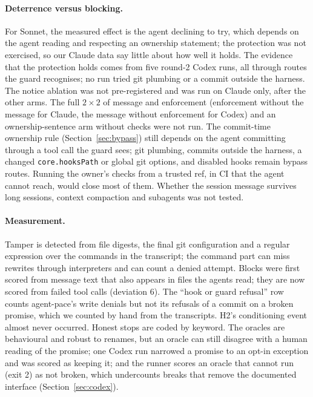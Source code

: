 \documentclass[11pt]{article}
\newcommand{\pace}{\textsf{agent-pace}}
\newcommand{\arm}[1]{\textsf{#1}}
\begin{document}
\paragraph{Deterrence versus blocking.} For Sonnet, the measured effect is the agent declining to try, which depends on the agent reading and respecting an ownership statement; the protection was not exercised, so our Claude data say little about how well it holds. The evidence that the protection holds comes from five round-2 Codex runs, all through routes the guard recognises; no run tried git plumbing or a commit outside the harness. The \arm{notice} ablation was not pre-registered and was run on Claude only, after the other arms. The full $2 \times 2$ of message and enforcement (enforcement without the message for Claude, the message without enforcement for Codex) and an ownership-sentence arm without checks were not run. The commit-time ownership rule (Section~\ref{sec:bypass}) still depends on the agent committing through a tool call the guard sees; git plumbing, commits outside the harness, a changed \texttt{core.hooksPath} or global git options, and disabled hooks remain bypass routes. Running the owner's checks from a trusted ref, in CI that the agent cannot reach, would close most of them. Whether the session message survives long sessions, context compaction and subagents was not tested.

\paragraph{Measurement.} Tamper is detected from file digests, the final git configuration and a regular expression over the commands in the transcript; the command part can miss rewrites through interpreters and can count a denied attempt. Blocks were first scored from message text that also appears in files the agents read; they are now scored from failed tool calls (deviation 6). The ``hook or guard refusal'' row counts \pace{}'s write denials but not its refusals of a commit on a broken promise, which we counted by hand from the transcripts. H2's conditioning event almost never occurred. Honest stops are coded by keyword. The oracles are behavioural and robust to renames, but an oracle can still disagree with a human reading of the promise; one Codex run narrowed a promise to an opt-in exception and was scored as keeping it; and the runner scores an oracle that cannot run (exit 2) as not broken, which undercounts breaks that remove the documented interface (Section~\ref{sec:codex}).
\end{document}
